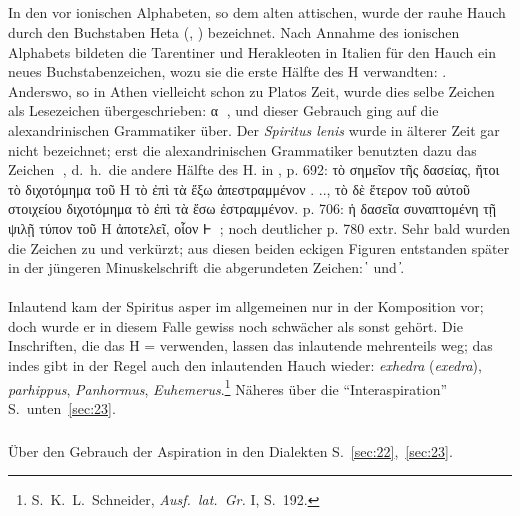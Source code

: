 {\small\noindent\subparagraph{} In den vor ionischen Alphabeten, so dem alten
attischen, wurde der rauhe Hauch durch den Buchstaben Heta (,
) bezeichnet. Nach Annahme des ionischen Alphabets bildeten die
Tarentiner und Herakleoten in Italien für den Hauch ein neues Buchstabenzeichen,
wozu sie die erste Hälfte des Η verwandten: . Anderswo, so in
Athen vielleicht schon zu Platos Zeit, wurde dies selbe Zeichen als Lesezeichen
übergeschrieben: {\thirdiarygreek{} α }, und dieser Gebrauch ging auf die
alexandrinischen Grammatiker über. Der \emph{Spiritus lenis} wurde in älterer
Zeit gar nicht bezeichnet; erst die alexandrinischen Grammatiker benutzten dazu
das Zeichen {\thirdiarygreek{}}, d.~h.\ die andere Hälfte des Η\@.
 in , p. 692: τὸ σημεῖον
τῆς δασείας, ἤτοι τὸ διχοτόμημα τοῦ Η τὸ ἐπὶ τὰ ἔξω ἀπεστραμμένον {.} {..}, τὸ
δὲ ἕτερον τοῦ αὐτοῦ στοιχείου διχοτόμημα τὸ ἐπὶ τὰ ἔσω ἐστραμμένον. p. 706: ἡ
δασεῖα συναπτομένη τῇ ψιλῇ τύπον τοῦ Η ἀποτελεῖ, οἷον {\thirdiarygreek{}𐅂 };
noch deutlicher p. 780 extr. Sehr bald wurden die Zeichen zu  und
 verkürzt; aus diesen beiden eckigen
Figuren entstanden später in der jüngeren Minuskelschrift die abgerundeten
Zeichen: \hspace{0.3em}  ̔\ und \hspace{0.3em} ̓\hspace{0.3em}.}

\paragraph{} Inlautend kam der Spiritus asper im allgemeinen nur in der
Komposition vor; doch wurde er in diesem Falle gewiss noch schwächer als sonst
gehört. Die Inschriften, die das Η =  verwenden, lassen das inlautende
mehrenteils weg; das  indes gibt in der Regel auch den
inlautenden
Hauch wieder: \emph{exhedra} (\emph{exedra}), \emph{parhippus},
\emph{Panhormus}, \emph{Euhemerus}.\footnote{S.~K.~L.~Schneider, \emph{Ausf.\
		lat.\ Gr.} I, S.\ 192.}
Näheres über die “Interaspiration” S.~unten~\ref{sec:23}.

\setcounter{subparagraph}{1}
{\small\noindent\subparagraph{} Über den Gebrauch der Aspiration in den Dialekten
	S.~\ref{sec:22},~\ref{sec:23}.}

